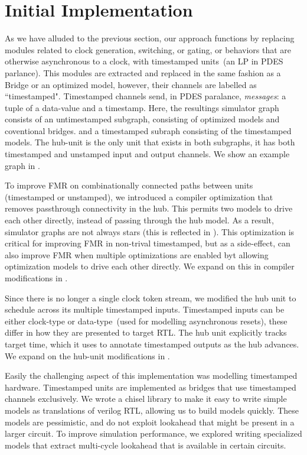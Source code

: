 \section{Initial Implementation}

As we have alluded to the previous section, our approach functions by replacing
modules related to clock generation, switching, or gating, or behaviors that
are otherwise asynchronous to a clock, with timestamped units~(an LP in PDES
parlance). This modules are extracted and replaced in the same fashion as a
Bridge or an optimized model, however, their channels are labelled as
``timestamped". Timestamped channels send, in PDES paralance, \emph{messages}:
a tuple of a data-value and a timestamp. Here, the resultings simulator graph
consists of an untimestamped subgraph, consisting of optimized models and
coventional bridges. and a timestamped subraph consisting of the timestamped
models. The hub-unit is the only unit that exists in both subgraphs, it has
both timestamped and unstamped input and output channels. We show an example graph in .

To improve FMR on combinationally connected paths between units (timestamped or
unstamped), we introduced a compiler optimization that removes passthrough
connectivity in the hub. This permits two models to drive each other directly,
instead of passing through the hub model. As a result, simulator graphs are not
always stars (this is reflected in ). This optimization is
critical for improving FMR in non-trival timestamped, but as a side-effect, can
also improve FMR when multiple optimizations are enabled byt allowing
optimization models to drive each other directly. We expand on this in compiler modifications in .

Since there is no longer a single clock token stream, we modified the hub unit
to schedule across its multiple timestamped inputs. Timestamped inputs can be
either clock-type or data-type~(used for modelling asynchronous resets), these
differ in how they are presented to target RTL. The hub unit explicitly tracks
target time, which it uses to annotate timestamped outputs as the hub advances.
We expand on the hub-unit modifications in .

Easily the challenging aspect of this implementation was modelling
timestamped hardware. Timestamped units are implemented as bridges that use
timestamped channels exclusively. We wrote a chisel library to make it easy to
write simple models as translations of verilog RTL, allowing us to build models
quickly. These models are pessimistic, and do not exploit lookahead that might
be present in a larger circuit. To improve simulation performance, we explored
writing specialized models that extract multi-cycle lookahead that is available
in certain circuits.


